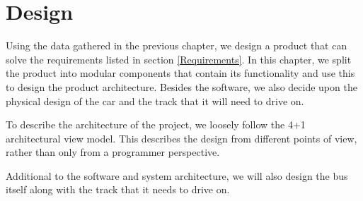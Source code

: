 \chapter{Design}

Using the data gathered in the previous chapter, we design a product that can solve the requirements listed in section \ref{Requirements}. In this chapter, we split the product into modular components that contain its functionality and use this to design the product architecture. Besides the software, we also decide upon the physical design of the car and the track that it will need to drive on. 

To describe the architecture of the project, we loosely follow the 4+1 architectural view model. This describes the design from different points of view, rather than only from a programmer perspective. 

Additional to the software and system architecture, we will also design the bus itself along with the track that it needs to drive on. 










